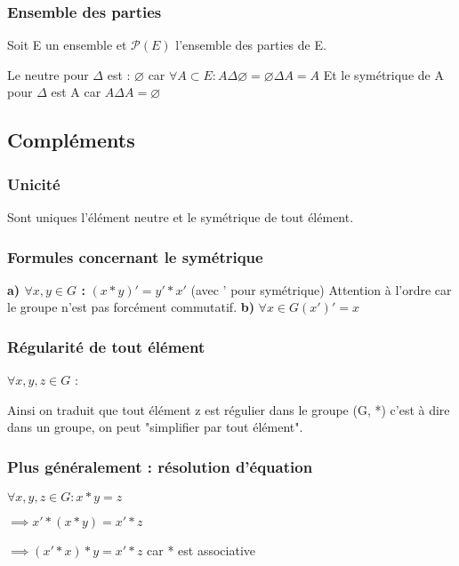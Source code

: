 \documentclass[12pt,a4paper,french]{book}
\begin{document}
\begin{spacing}{1.0}
			\subsubsection{Ensemble des parties}
			\begin{spacing}{1.0}
				Soit E un ensemble et \(\mathscr{P}(E)\) l'ensemble des parties de E.
				\begin{center}
				\end{center}
				Le neutre pour \(\Delta\) est  : \(\varnothing\) car \(\forall A \subset E : A \Delta \varnothing = \varnothing \Delta A = A\)
				Et le symétrique de A pour \(\Delta\) est A car \(A \Delta A = \varnothing\)
			\end{spacing}
		\subsection{Compléments}
			\subsubsection{Unicité}
			Sont uniques l'élément neutre et le symétrique de tout élément.
			\subsubsection{Formules concernant le symétrique}
			\textbf{a) \(\forall x,y \in G\) :}
			\((x * y)' = y' * x'\) (avec ' pour symétrique)
			Attention à l'ordre car le groupe n'est pas forcément commutatif.
			\textbf{b)} \(\forall x \in G (x')' = x\)
			\subsubsection{Régularité de tout élément}
			\(\forall x, y, z \in G \) : 
			
			Ainsi on traduit que tout élément z est régulier dans le groupe (G, *) c'est à dire dans un groupe, on peut "simplifier par tout élément".
			\subsubsection{Plus généralement : résolution d'équation}
			\(\forall x, y, z \in G : x * y = z\)
			
			\(\implies x' * (x * y) = x' * z\)
			
			\(\implies (x' * x) * y = x' * z\) car * est associative
			

\end{spacing}
\end{document}
